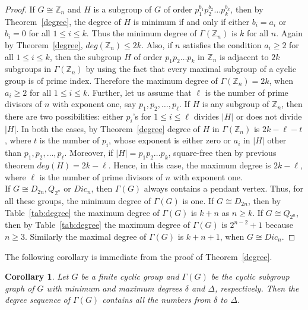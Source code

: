 \documentclass[11pt,twoside]{amsart}
\def \Z {{\mathbb{Z}}}
\def \Ga {{\Gamma }}
\newtheorem{cor}[theorem]{Corollary}
\begin{document}
\begin{proof}
           If $G\cong \Z_n$ and $H$ is a subgroup of $G$ of order $p_1^{b_1}p_2^{b_2}\dots p_k^{b_k}$, then by Theorem~\ref{degree}, the degree of $H$ is minimum if and only if either $b_i=a_i$ or $b_i=0$ for all $1\leq i\leq k$. Thus the minimum degree of $\Gamma (\Z_n)$ is $k$ for all $n$. Again by Theorem~\ref{degree}, $deg (\Z_n)\leq 2k$. Also, if $n$ satisfies the condition $a_i\geq 2$ for all $1\leq i\leq k$, then the subgroup $H$ of order $p_1p_2\dots p_k$ in $\Z_n$ is adjacent to $2k$ subgroups in $\Gamma (\Z_n)$ by using the fact that every maximal subgroup of a cyclic group is of prime index. Therefore the maximum degree of $\Gamma (\Z_n)=2k$, when $a_i\geq 2$ for all $1\leq i\leq k$. Further, let us assume that $\ell$ is the number of prime divisors of $n$ with exponent one, say $p_1,p_2,\dots, p_{\ell}$. If $H$ is any subgroup of $\Z_n$, then there are two possibilities: either $p_i$'s for $1\leq i\leq \ell$ divides $|H|$ or does not divide $|H|$. In both the cases, by Theorem~\ref{degree} degree of $H$ in $\Gamma (\Z_n)$ is $2k-\ell-t$, where $t$ is the number of $p_i$, whose exponent is either zero or $a_i$ in $|H|$ other than $p_1,p_2,\dots, p_{\ell}$. Moreover, if $|H|=p_1p_2\dots p_k$, square-free then by previous theorem $deg (H)=2k-{\ell}$. Hence, in this case, the maximum degree is $2k-{\ell}$, where $\ell$ is the number of prime divisors of $n$ with exponent one.\\
           If $G\cong D_{2n}, Q_{2^n}$ or $Dic_n$, then $\Gamma (G)$ always contains a pendant vertex. Thus, for all these groups, the minimum degree of $\Gamma (G)$ is one. If $G\cong D_{2n}$, then by Table~\ref{tab:degree} the maximum degree of $\Gamma (G)$ is $k+n$ as $n\geq k$. If $G\cong Q_{2^n}$, then by Table~\ref{tab:degree} the maximum degree of $\Gamma (G)$ is $2^{n-2}+1$ because $n\geq 3$. Similarly the maximal degree of $\Gamma (G)$ is $k+n+1$, when $G\cong Dic_n$.
       \end{proof}
       The following corollary is immediate from the proof of Theorem~\ref{degree}.
       \begin{cor}
           Let $G$ be a finite cyclic group and $\Ga (G)$ be the cyclic subgroup graph of $G$ with minimum and maximum degrees $\delta$ and $\Delta$, respectively. Then the degree sequence of $\Ga (G)$ contains all the numbers from $\delta$ to $\Delta$.
       \end{cor}
\end{document}
